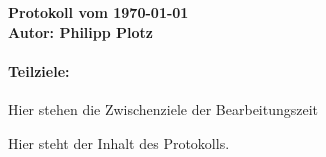 \documentclass[a4paper,10pt]{article}
\begin{document}
\vspace*{1cm}

{\bfseries \large Protokoll vom \today \\[1mm]		%
\normalfont Autor: Philipp Plotz}					%

\vspace{2cm}

\paragraph{Teilziele:}								%
Hier stehen die Zwischenziele der Bearbeitungszeit

\vspace{2cm}

Hier steht der Inhalt des Protokolls.
\end{document}
